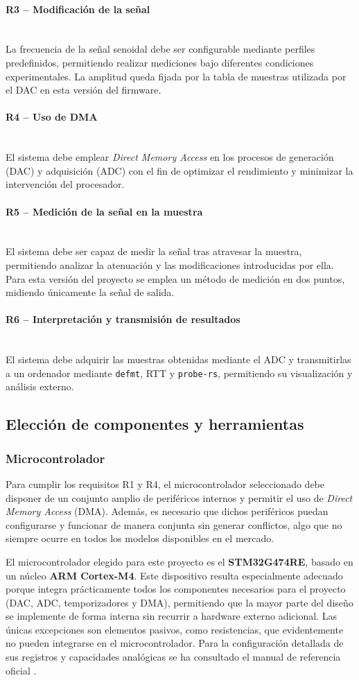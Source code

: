 \documentclass[11pt,a4paper]{article}
\newcommand{\myparagraph}[1]{\paragraph{#1}\mbox{}\\}
\begin{document}
\myparagraph{R3 – Modificación de la señal}
La frecuencia de la señal senoidal debe ser configurable mediante perfiles predefinidos, permitiendo realizar mediciones bajo diferentes condiciones experimentales. La amplitud queda fijada por la tabla de muestras utilizada por el DAC en esta versión del firmware.

\myparagraph{R4 – Uso de DMA}
El sistema debe emplear \textit{Direct Memory Access} en los procesos de generación (DAC) y adquisición (ADC) con el fin de optimizar el rendimiento y minimizar la intervención del procesador.

\myparagraph{R5 – Medición de la señal en la muestra}
El sistema debe ser capaz de medir la señal tras atravesar la muestra, permitiendo analizar la atenuación y las modificaciones introducidas por ella. Para esta versión del proyecto se emplea un método de medición en dos puntos, midiendo únicamente la señal de salida.

\myparagraph{R6 – Interpretación y transmisión de resultados}
El sistema debe adquirir las muestras obtenidas mediante el ADC y transmitirlas a un ordenador mediante \texttt{defmt}, RTT y \texttt{probe-rs}, permitiendo su visualización y análisis externo.



\subsection{Elección de componentes y herramientas}

\subsubsection{Microcontrolador}

Para cumplir los requisitos R1 y R4, el microcontrolador seleccionado debe disponer de un conjunto amplio de periféricos internos y permitir el uso de \textit{Direct Memory Access} (DMA). Además, es necesario que dichos periféricos puedan configurarse y funcionar de manera conjunta sin generar conflictos, algo que no siempre ocurre en todos los modelos disponibles en el mercado.

El microcontrolador elegido para este proyecto es el \textbf{STM32G474RE}, basado en un núcleo \textbf{ARM Cortex-M4}. Este dispositivo resulta especialmente adecuado porque integra prácticamente todos los componentes necesarios para el proyecto (DAC, ADC, temporizadores y DMA), permitiendo que la mayor parte del diseño se implemente de forma interna sin recurrir a hardware externo adicional. Las únicas excepciones son elementos pasivos, como resistencias, que evidentemente no pueden integrarse en el microcontrolador. Para la configuración detallada de sus registros y capacidades analógicas se ha consultado el manual de referencia oficial \cite{stmanual}.
\end{document}
